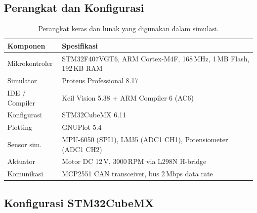 \documentclass[12pt,a4paper]{article}
\begin{document}
\subsection{Perangkat dan Konfigurasi}

\begin{table}[H]
\centering
\caption{Perangkat keras dan lunak yang digunakan dalam simulasi.}
\label{tab:tools}
\begin{tabularx}{\textwidth}{@{} l X @{}}
\toprule
\textbf{Komponen} & \textbf{Spesifikasi}\\
\midrule
Mikrokontroler  & STM32F407VGT6, ARM Cortex-M4F, 168\,MHz, 1\,MB Flash, 192\,KB RAM\\
Simulator       & Proteus Professional 8.17\\
IDE / Compiler  & Keil \textmu{}Vision 5.38 + ARM Compiler 6 (AC6)\\
Konfigurasi     & STM32CubeMX 6.11\\
Plotting        & GNUPlot 5.4\\
Sensor sim.     & MPU-6050 (SPI1), LM35 (ADC1 CH1), Potensiometer (ADC1 CH2)\\
Aktuator        & Motor DC 12\,V, 3000\,RPM via L298N H-bridge\\
Komunikasi      & MCP2551 CAN transceiver, bus 2\,Mbps data rate\\
\bottomrule
\end{tabularx}
\end{table}

\subsection{Konfigurasi STM32CubeMX}
\end{document}
